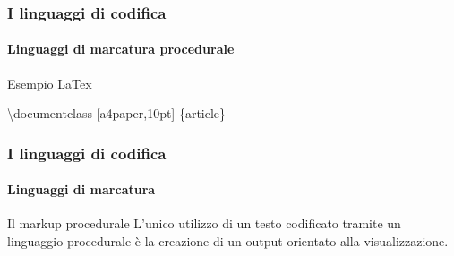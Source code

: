 \documentclass{beamer}
\begin{document}
\begin{frame}
	\frametitle{I linguaggi di codifica}
	\framesubtitle{Linguaggi di marcatura procedurale}
	\addtocounter{nframe}{1}

	\begin{block}{Esempio LaTex}
        \begin{tiny}
            
			\backslash documentclass [a4paper,10pt] \{article\} 
		\end{tiny}
	\end{block}

\end{frame}

\begin{frame}
	\frametitle{I linguaggi di codifica}
	\framesubtitle{Linguaggi di marcatura}
	\addtocounter{nframe}{1}

	\begin{block}{Il markup procedurale}
		L’unico utilizzo di un testo codificato tramite un linguaggio procedurale è la creazione di un output orientato alla visualizzazione.
	\end{block}
\end{frame}
\end{document}
